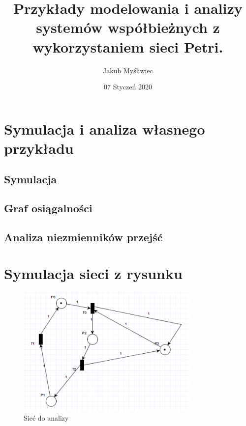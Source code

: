 \documentclass{article}
\title{Przykłady modelowania i analizy systemów
współbieżnych z wykorzystaniem sieci Petri.}
\author{Jakub Myśliwiec}
\date{07 Styczeń 2020}
\begin{document}
\maketitle


\section{Symulacja i analiza własnego przykładu}

\subsection{Symulacja}
\subsection{Graf osiągalności}
\subsection{Analiza niezmienników przejść}

\section{Symulacja sieci z rysunku}
\begin{figure}[H]
    \centering
    \includegraphics[width=0.8\textwidth, height=0.4\textheight]{zad2.png}
    \caption{Sieć do analizy}
\end{figure}
\end{document}
